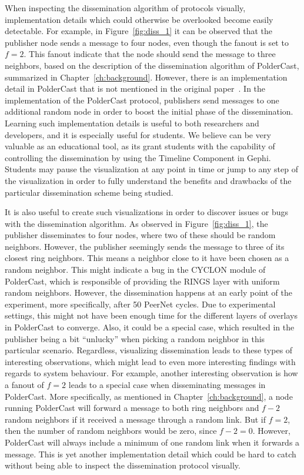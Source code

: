 When inspecting the dissemination algorithm of protocols visually,
implementation details which could otherwise be overlooked become easily
detectable. For example, in Figure~\ref{fig:diss_1} it can be observed
that the publisher node sends a message to four nodes, even though the
fanout is set to $f=2$. This fanout indicate that the node
should send the message to three neighbors, based on the description of
the dissemination algorithm of PolderCast, summarized in
Chapter~\ref{ch:background}. However, there is an implementation detail
in PolderCast that is not mentioned in the original
paper~\cite{Setty:2012}. In the implementation of the PolderCast
protocol, publishers send messages to one additional random node in
order to boost the initial phase of the dissemination. Learning such
implementation details is useful to both researchers and developers, and
it is especially useful for students. We believe \demo can be very
valuable as an educational tool, as its grant students with the
capability of controlling the dissemination by using the Timeline
Component in Gephi. Students may pause the visualization at any point in
time or jump to any step of the visualization in order to fully
understand the benefits and drawbacks of the particular dissemination
scheme being studied.

It is also useful to create such visualizations in order to discover
issues or bugs with the dissemination algorithm. As observed in
Figure~\ref{fig:diss_1}, the publisher disseminates to four nodes, where
two of these should be random neighbors. However, the publisher
seemingly sends the message to three of its closest ring neighbors.
This means a neighbor close to it have been chosen as a random neighbor.
This might indicate a bug in the CYCLON module of PolderCast, which is
responsible of providing the RINGS layer with uniform random neighbors.
However, the dissemination happens at an early point of the experiment,
more specifically, after 50 PeerNet cycles. Due to experimental
settings, this might not have been enough time for the different layers
of overlays in PolderCast to converge. Also, it could be a special case,
which resulted in the publisher being a bit ``unlucky'' when picking a
random neighbor in this particular scenario. Regardless, visualizing
dissemination leads to these types of interesting observations, which
might lead to even more interesting findings with regards to system
behaviour. For example, another interesting observation is how a fanout
of $f=2$ leads to a special case when disseminating messages in
PolderCast. More specifically, as mentioned in
Chapter~\ref{ch:background}, a node running PolderCast will forward a
message to both ring neighbors and $f-2$ random neighbors if it received
a message through a random link.  But if $f=2$, then the number of
random neighbors would be zero, since $f-2 = 0$. However, PolderCast
will always include a minimum of one random link when it forwards a
message. This is yet another implementation detail which could be hard
to catch without being able to inspect the dissemination protocol
visually.

